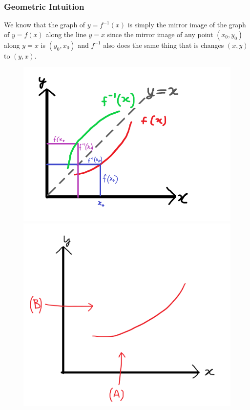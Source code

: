 \documentclass[14]{article}
\theoremstyle{definition}
\theoremstyle{case}
\begin{document}
\subsubsection{Geometric Intuition}
We know that the graph of $y = f^{-1}(x)$ is simply the mirror image of the graph of $y = f(x)$ along the line $y = x$ since the mirror image of any point $(x_0, y_0)$ along $y = x$ is $(y_0, x_0)$ and $f^{-1}$ also does the same thing that is changes $(x, y)$ to $(y, x)$.\\
\begin{figure}[h]
\includegraphics[scale=0.4]{images/newton_prop_1}
\includegraphics[scale=0.4]{images/newton_prop_2}
\end{figure}\\
\end{document}
